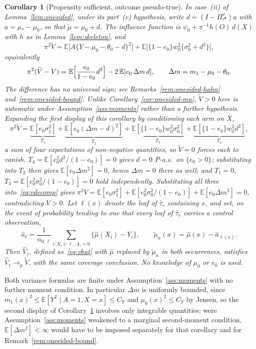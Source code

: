 \documentclass[11pt]{article}
\theoremstyle{plain}
\newtheorem{corollary}[theorem]{Corollary}
\theoremstyle{definition}
\theoremstyle{remark}
\newcommand{\E}{\mathbb{E}}
\newcommand{\ez}{e_0}
\newcommand{\mz}{\mu_0}
\newcommand{\wz}{w_0}
\newcommand{\mhat}{\widehat{\mu}}
\newcommand{\that}{\widehat{\tau}}
\newcommand{\Vhat}{\widehat{V}}
\newcommand{\mtil}{\widetilde{\mu}}
\newcommand{\Vtil}{\widetilde{V}}
\begin{document}
\begin{corollary}[Propensity sufficient, outcome pseudo-true]
\label{cor:onesided-e}
In case~(ii) of Lemma~\ref{lem:onesided}, under its part~(c) hypothesis, write
$d=(I-\Pi^\nu_{\tau^\bullet})a$ with $a=\mu_*-\mz$, so that $\mtil=\mz+d$. The
influence function is $\psi_0+\pi^{-1}h(O)\,d(X)$ with $h$ as in
Lemma~\ref{lem:skeleton}, and
\[
  \pi^2\Vtil=\E\bigl[A\{Y-\mz-\theta_0-d\}^2\bigr]
   +\E\bigl[\{1-\ez\}\wz^2\{\sigma_0^2+d^2\}\bigr],
\]
equivalently
\[
  \pi^2(\Vtil-V)=\E\Bigl[\frac{\ez}{1-\ez}d^2\Bigr]-2\,\E[\ez\,\Delta m\,d],
  \qquad \Delta m=m_1-\mz-\theta_0 .
\]
The difference has no universal sign; see
Remarks~\ref{rem:onesided-hahn} and~\ref{rem:onesided-bound}. Unlike
Corollary~\ref{cor:onesided-mu}, $\Vtil>0$ here is automatic under
Assumption~\ref{ass:moments} rather than a further hypothesis. Expanding the
first display of this corollary by conditioning each arm on $X$,
\[
  \pi^2\Vtil=\underbrace{\E[\ez\sigma_1^2]}_{T_1}
   +\underbrace{\E[\ez(\Delta m-d)^2]}_{T_2}
   +\underbrace{\E[\{1-\ez\}\wz^2\sigma_0^2]}_{T_3}
   +\underbrace{\E[\{1-\ez\}\wz^2d^2]}_{T_4},
\]
a sum of four expectations of non-negative quantities, so $\Vtil=0$ forces
each to vanish. $T_4=\E[\ez^2d^2/(1-\ez)]=0$ gives $d=0$ $P$-a.s.\ on
$\{\ez>0\}$; substituting into $T_2$ then gives $\E[\ez\Delta m^2]=0$, hence
$\Delta m=0$ there as well; and $T_1=0$, $T_3=\E[\ez^2\sigma_0^2/(1-\ez)]=0$
hold independently. Substituting all three into~\eqref{eq:vdecomp} gives
$\pi^2V=\E[\ez\sigma_1^2]+\E[\ez^2\sigma_0^2/(1-\ez)]+\E[\ez\Delta m^2]=0$,
contradicting $V>0$.
Let $\ell(x)$
denote the leaf of $\that_e$ containing $x$, and set, on the event of
probability tending to one that every leaf of $\that_e$ carries a control
observation,
\[
  \widehat a_\ell=\frac1{n_{0,\ell}}\sum_{i:X_i\in\ell,\,A_i=0}
   \bigl\{\mhat(X_i)-Y_i\bigr\},\qquad
  \mtil_n(x)=\mhat(x)-\widehat a_{\ell(x)} .
\]
Then $\Vhat_\dagger$, defined as~\eqref{eq:vhat} with $\mhat$ replaced by $\mtil_n$ in
both occurrences, satisfies $\Vhat_\dagger\to_p\Vtil$, with the same coverage conclusion.
No knowledge of $\mz$ or $\ez$ is used.
\end{corollary}

\noindent Both variance formulas are finite under
Assumption~\ref{ass:moments} with no further moment condition. In particular
$\Delta m$ is uniformly bounded, since $m_1(x)^2\le\E[Y^2\mid A=1,X=x]\le C_Y$
and $\mz(x)^2\le C_Y$ by Jensen, so the second display of
Corollary~\ref{cor:onesided-e} involves only integrable quantities; were
Assumption~\ref{ass:moments} weakened to a marginal second-moment condition,
$\E[\Delta m^2]<\infty$ would have to be imposed separately for that corollary
and for Remark~\ref{rem:onesided-bound}.
\end{document}
